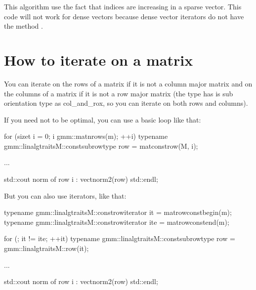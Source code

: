 \documentclass[a4paper,11pt,english]{sphinxmanual}
\begin{document}
This algorithm use the fact that indices are increasing in a sparse vector. This code will not work for dense vectors because dense vector iterators do not have the method .


\section{How to iterate on a matrix}
\label{\detokenize{gmm/inside:how-to-iterate-on-a-matrix}}
You can iterate on the rows of a matrix if it is not a column major matrix and on the columns of a matrix if it is not a row major matrix (the type  has is sub orientation type as col\_and\_rox, so you can iterate on both rows and columns).

If you need not to be optimal, you can use a basic loop like that:

\begin{sphinxVerbatim}[commandchars=\\\{\}]
for (size\PYGZus{}t i = 0; i \PYGZlt{} gmm::mat\PYGZus{}nrows(m); ++i) \PYGZob{}
  typename gmm::linalg\PYGZus{}traits\PYGZlt{}M\PYGZgt{}::const\PYGZus{}sub\PYGZus{}row\PYGZus{}type row = mat\PYGZus{}const\PYGZus{}row(M, i);

  ...

  std::cout \PYGZlt{}\PYGZlt{} \PYGZdq{}norm of row \PYGZdq{} \PYGZlt{}\PYGZlt{} i \PYGZlt{}\PYGZlt{} \PYGZdq{} : \PYGZdq{} \PYGZlt{}\PYGZlt{} vect\PYGZus{}norm2(row) \PYGZlt{}\PYGZlt{} std::endl;
\PYGZcb{}
\end{sphinxVerbatim}

But you can also use iterators, like that:

\begin{sphinxVerbatim}[commandchars=\\\{\}]
typename gmm::linalg\PYGZus{}traits\PYGZlt{}M\PYGZgt{}::const\PYGZus{}row\PYGZus{}iterator it = mat\PYGZus{}row\PYGZus{}const\PYGZus{}begin(m);
typename gmm::linalg\PYGZus{}traits\PYGZlt{}M\PYGZgt{}::const\PYGZus{}row\PYGZus{}iterator ite = mat\PYGZus{}row\PYGZus{}const\PYGZus{}end(m);

for (; it != ite; ++it) \PYGZob{}
  typename gmm::linalg\PYGZus{}traits\PYGZlt{}M\PYGZgt{}::const\PYGZus{}sub\PYGZus{}row\PYGZus{}type
    row = gmm::linalg\PYGZus{}traits\PYGZlt{}M\PYGZgt{}::row(it);

  ...

  std::cout \PYGZlt{}\PYGZlt{} \PYGZdq{}norm of row \PYGZdq{} \PYGZlt{}\PYGZlt{} i \PYGZlt{}\PYGZlt{} \PYGZdq{} : \PYGZdq{} \PYGZlt{}\PYGZlt{} vect\PYGZus{}norm2(row) \PYGZlt{}\PYGZlt{} std::endl;
\PYGZcb{}
\end{sphinxVerbatim}
\end{document}
